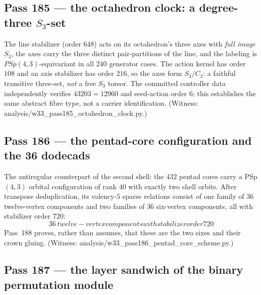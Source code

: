 \documentclass[12pt,a4paper]{article}
\def\mathrm#1{#1}%
\def\texttt#1{#1}%
\def\text#1{#1}%
\def\cdot{ }%
\theoremstyle{definition}
\newcommand{\PSp}{\mathrm{PSp}}
\begin{document}
\subsection{Pass 185 --- the octahedron clock: a degree-three $S_3$-set}
\label{ssec:pass185}

The line stabilizer (order $648$) acts on its octahedron's three axes
with \emph{full image $S_3$}, the axes carry the three distinct
pair-partitions of the line, and the labeling is
$\PSp(4,3)$-equivariant in all $240$ generator cases.  The action kernel
has order $108$ and an axis stabilizer has order $216$, so the axes form
$S_3/C_2$: a faithful transitive three-set, \emph{not} a free $S_3$
torsor.  The committed controller data independently verifies
$4320\cdot3=12960$ and seed-action order $6$; this establishes the same
abstract fibre type, not a carrier identification. (Witness:
\texttt{analysis/w33\_pass185\_octahedron\_clock.py}.)

\subsection{Pass 186 --- the pentad-core configuration and the 36
dodecads}
\label{ssec:pass186}

The antiregular counterpart of the second shell: the $432$ pentad cores
carry a PSp$(4,3)$ orbital configuration of rank $40$ with exactly two
shell orbits.  After transpose deduplication, its valency-$5$ sparse
relations consist of one family of $36$ twelve-vertex components and two
families of $36$ six-vertex components, all with stabilizer order $720$:
\[
  \boxed{\,36\ \text{twelve-vertex components with stabilizer order }720\,}
\]
Pass~188 proves, rather than assumes, that these are the two sixes and
their crown gluing. (Witness:
\texttt{analysis/w33\_pass186\_pentad\_core\_scheme.py}.)

\subsection{Pass 187 --- the layer sandwich of the binary permutation
module}
\label{ssec:pass187}
\end{document}
